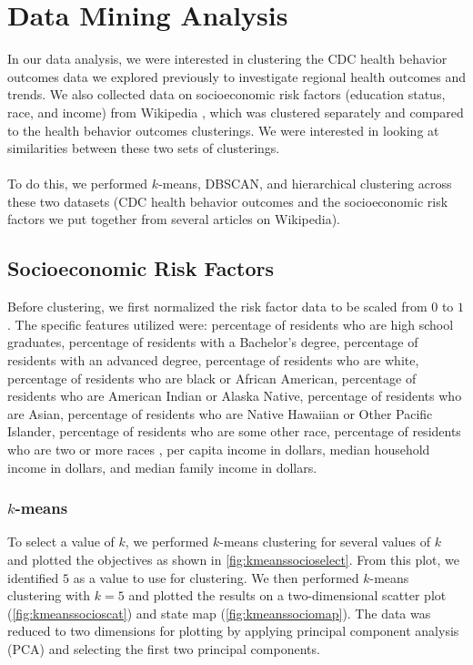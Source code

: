\documentclass{article}
\begin{document}
\section{Data Mining Analysis}
\label{dataanalysis}
In our data analysis, we were interested in clustering the CDC health behavior outcomes data we explored previously to investigate regional health outcomes and trends. We also collected data on socioeconomic risk factors (education status, race, and income) from Wikipedia \cite{demodata, eduratesdata, incomedata}, which was clustered separately and compared to the health behavior outcomes clusterings. 
We were interested in looking at similarities between these two sets of clusterings.
\\\\
To do this, we performed $k$-means, DBSCAN, and hierarchical clustering across these two datasets (CDC health behavior outcomes and the socioeconomic risk factors we put together from several articles on Wikipedia).

\subsection{Socioeconomic Risk Factors}
Before clustering, we first normalized the risk factor data to be scaled from $0$ to $1$. The specific features utilized were: percentage of residents who are high school graduates, percentage of residents with a Bachelor's degree, percentage of residents with an advanced degree, percentage of residents who are white, percentage of residents who are black or African American, percentage of residents who are American Indian or Alaska Native, percentage of residents who are Asian, percentage of residents who are Native Hawaiian or Other Pacific Islander, percentage of residents who are some other race, percentage of residents who are two or more races	, per capita income in dollars, median household income in dollars, and median family income in dollars.

\subsubsection{$k$-means}
To select a value of $k$, we performed $k$-means clustering for several values of $k$ and plotted the objectives as shown in \cref{fig:kmeanssocioselect}. From this plot, we identified $5$ as a value to use for clustering. We then performed $k$-means clustering with $k=5$ and plotted the results on a two-dimensional scatter plot (\cref{fig:kmeanssocioscat}) and state map (\cref{fig:kmeanssociomap}). The data was reduced to two dimensions for plotting by applying principal component analysis (PCA) and selecting the first two principal components.
\end{document}
